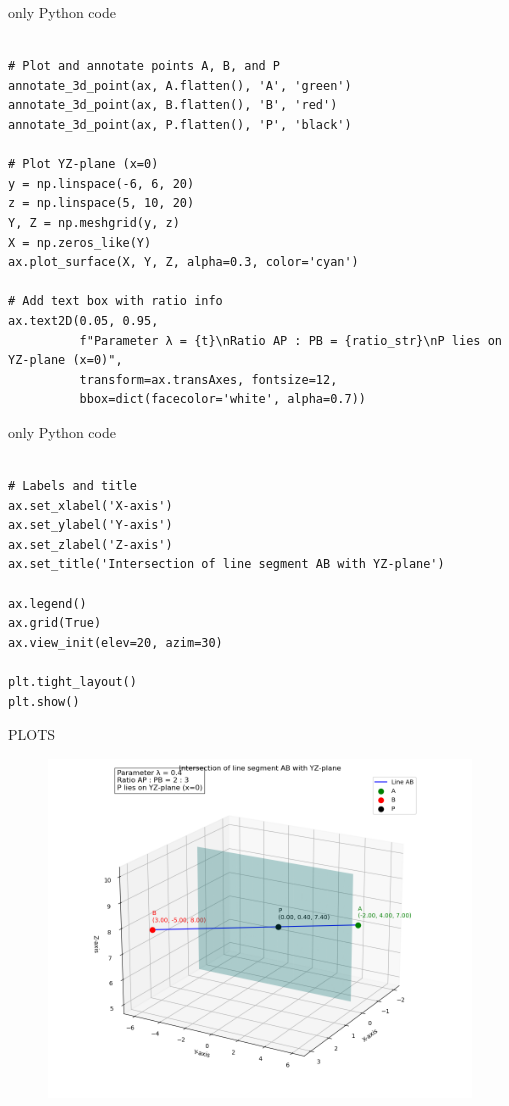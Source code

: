 \documentclass{beamer}
\begin{document}
\begin{frame}[fragile]{only Python code}
\begin{lstlisting}

# Plot and annotate points A, B, and P
annotate_3d_point(ax, A.flatten(), 'A', 'green')
annotate_3d_point(ax, B.flatten(), 'B', 'red')
annotate_3d_point(ax, P.flatten(), 'P', 'black')

# Plot YZ-plane (x=0)
y = np.linspace(-6, 6, 20)
z = np.linspace(5, 10, 20)
Y, Z = np.meshgrid(y, z)
X = np.zeros_like(Y)
ax.plot_surface(X, Y, Z, alpha=0.3, color='cyan')

# Add text box with ratio info
ax.text2D(0.05, 0.95,
          f"Parameter λ = {t}\nRatio AP : PB = {ratio_str}\nP lies on YZ-plane (x=0)",
          transform=ax.transAxes, fontsize=12,
          bbox=dict(facecolor='white', alpha=0.7))
 \end{lstlisting}
\end{frame}
\begin{frame}[fragile]{only Python code}
\begin{lstlisting}

# Labels and title
ax.set_xlabel('X-axis')
ax.set_ylabel('Y-axis')
ax.set_zlabel('Z-axis')
ax.set_title('Intersection of line segment AB with YZ-plane')

ax.legend()
ax.grid(True)
ax.view_init(elev=20, azim=30)

plt.tight_layout()
plt.show()

  \end{lstlisting}
\end{frame}
\begin{frame}[fragile]{PLOTS}
\begin{figure}
    \centering
    \includegraphics[width=0.9\columnwidth]{figs/fig_61.png}
    \caption{}
    \label{fig:placeholder}
\end{figure}
\end{frame}
\end{document}
